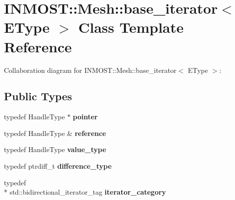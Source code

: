 \hypertarget{classINMOST_1_1Mesh_1_1base__iterator}{\section{I\-N\-M\-O\-S\-T\-:\-:Mesh\-:\-:base\-\_\-iterator$<$ E\-Type $>$ Class Template Reference}
\label{classINMOST_1_1Mesh_1_1base__iterator}
}


Collaboration diagram for I\-N\-M\-O\-S\-T\-:\-:Mesh\-:\-:base\-\_\-iterator$<$ E\-Type $>$\-:
\subsection*{Public Types}
\begin{DoxyCompactItemize}
\item 
\hypertarget{classINMOST_1_1Mesh_1_1base__iterator_a29cc18b3b80bca355984dc791f040f03}{typedef Handle\-Type $\ast$ {\bfseries pointer}}\label{classINMOST_1_1Mesh_1_1base__iterator_a29cc18b3b80bca355984dc791f040f03}

\item 
\hypertarget{classINMOST_1_1Mesh_1_1base__iterator_a67b7c0dba5f2926f55739d1e441347d8}{typedef Handle\-Type \& {\bfseries reference}}\label{classINMOST_1_1Mesh_1_1base__iterator_a67b7c0dba5f2926f55739d1e441347d8}

\item 
\hypertarget{classINMOST_1_1Mesh_1_1base__iterator_a6d47ff7ab477cc9c873c232236a860f0}{typedef Handle\-Type {\bfseries value\-\_\-type}}\label{classINMOST_1_1Mesh_1_1base__iterator_a6d47ff7ab477cc9c873c232236a860f0}

\item 
\hypertarget{classINMOST_1_1Mesh_1_1base__iterator_a83167a54e5fc607c5ce567420cef9614}{typedef ptrdiff\-\_\-t {\bfseries difference\-\_\-type}}\label{classINMOST_1_1Mesh_1_1base__iterator_a83167a54e5fc607c5ce567420cef9614}

\item 
\hypertarget{classINMOST_1_1Mesh_1_1base__iterator_af093745c78c6779d0c159a4671c1bd6b}{typedef \\*
std\-::bidirectional\-\_\-iterator\-\_\-tag {\bfseries iterator\-\_\-category}}\label{classINMOST_1_1Mesh_1_1base__iterator_af093745c78c6779d0c159a4671c1bd6b}

\end{DoxyCompactItemize}
